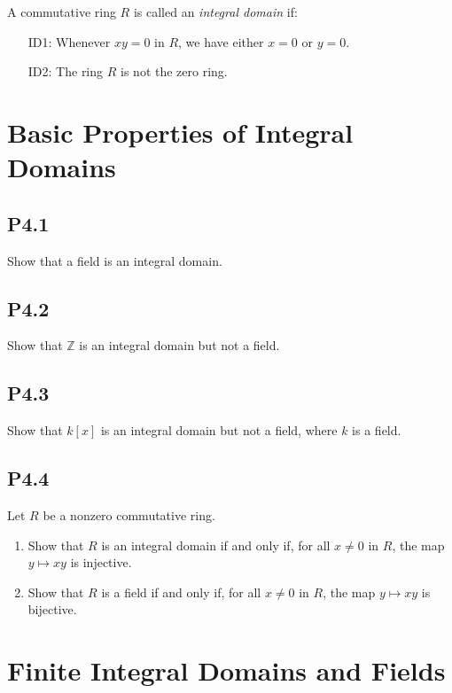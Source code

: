 \documentclass[lang=cn,11pt]{template}
\begin{document}
\begin{definition}
A commutative ring \( R \) is called an \textit{integral domain} if:
\begin{itemize}
    \item[ID1:] Whenever \( xy = 0 \) in \( R \), we have either \( x = 0 \) or \( y = 0 \).
    \item[ID2:] The ring \( R \) is not the zero ring.
\end{itemize}
\end{definition}

\section{Basic Properties of Integral Domains}

\subsection*{P4.1} Show that a field is an integral domain.

\subsection*{P4.2} Show that \( \mathbb{Z} \) is an integral domain but not a field.

\subsection*{P4.3} Show that \( k[x] \) is an integral domain but not a field, where \( k \) is a field.

\subsection*{P4.4} Let \( R \) be a nonzero commutative ring.
\begin{enumerate}
    \item Show that \( R \) is an integral domain if and only if, for all \( x \neq 0 \) in \( R \), the map \( y \mapsto xy \) is injective.
    \item Show that \( R \) is a field if and only if, for all \( x \neq 0 \) in \( R \), the map \( y \mapsto xy \) is bijective.
\end{enumerate}

\section{Finite Integral Domains and Fields}
\end{document}
